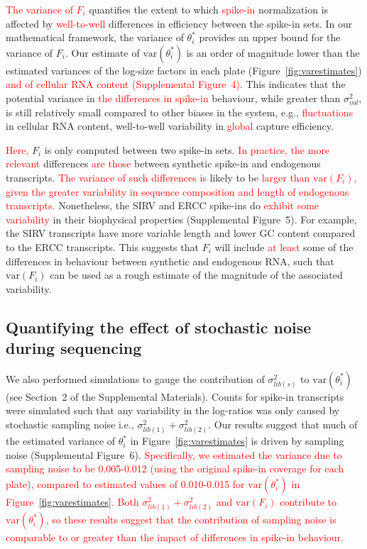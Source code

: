 \documentclass{article}
\newcommand{\suppfigcell}{4}
\newcommand{\suppfigbiophys}{5}
\newcommand{\suppfignoise}{6}
\newcommand{\suppsecnoise}{2}
\newcommand{\revised}[1]{\textcolor{red}{#1}}
\newcommand\variance{\mbox{var}}
\begin{document}
\revised{The variance of $F_i$} quantifies the extent to which \revised{spike-in} normalization is affected by \revised{well-to-well} differences in efficiency between the spike-in sets.
In our mathematical framework, the variance of $\theta^*_i$ provides an upper bound for the variance of $F_i$.
Our estimate of $\variance(\theta^*_i)$ is an order of magnitude lower than the estimated variances of the log-size factors in each plate (Figure~\ref{fig:varestimates}) \revised{and of cellular RNA content (Supplemental Figure~\suppfigcell{}).}
This indicates that the potential variance in \revised{the differences in spike-in} behaviour, while greater than $\sigma^2_{vol}$, is still relatively small compared to other biases in the system, e.g., \revised{fluctuations} in cellular RNA content, well-to-well variability in \revised{global} capture efficiency.

\revised{Here,} $F_i$ is only computed between two spike-in sets.
\revised{In practice, the more relevant} differences \revised{are those} between synthetic spike-in and endogenous transcripts.
\revised{The variance of such differences is} likely to be \revised{larger than $\variance(F_i)$, given the greater variability in sequence composition and length of endogenous transcripts.}
Nonetheless, the SIRV and ERCC spike-ins do \revised{exhibit some variability} in their biophysical properties (Supplemental Figure~\suppfigbiophys{}).
For example, the SIRV transcripts have more variable length and lower GC content compared to the ERCC transcripts.
This suggests that $F_i$ will include \revised{at least} some of the differences in behaviour between synthetic and endogenous RNA, such that $\variance(F_i)$ can be used as a rough estimate of the magnitude of the associated variability.


\subsection*{Quantifying the effect of stochastic noise during sequencing}
We also performed simulations to gauge the contribution of $\sigma^2_{lib(s)}$ to $\variance(\theta^*_i)$ (see Section~\suppsecnoise{} of the Supplemental Materials).
Counts for spike-in transcripts were simulated such that any variability in the log-ratios was only caused by stochastic sampling noise i.e., $\sigma^2_{lib(1)} + \sigma^2_{lib(2)}$.
Our results suggest that much of the estimated variance of $\theta^*_i$ in Figure~\ref{fig:varestimates} is driven by sampling noise (Supplemental Figure~\suppfignoise{}).
\revised{Specifically, we estimated the variance due to sampling noise to be 0.005-0.012 (using the original spike-in coverage for each plate), compared to estimated values of 0.010-0.015 for $\variance(\theta^*_i)$ in Figure~\ref{fig:varestimates}.
Both $\sigma^2_{lib(1)} + \sigma^2_{lib(2)}$ and  $\variance(F_i)$ contribute to  $\variance(\theta^*_i)$, so these results suggest that the contribution of sampling noise is comparable to or greater than the impact of differences in spike-in behaviour.}
\end{document}
